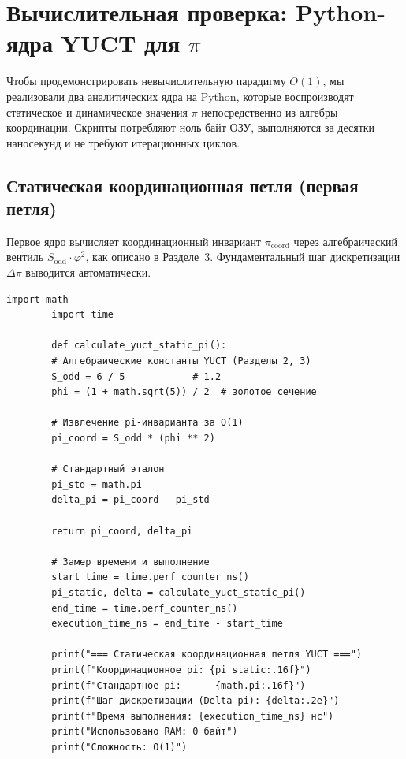 \documentclass[12pt,a4paper]{article}
\begin{document}
	\section{Вычислительная проверка: Python-ядра YUCT для $\pi$}
	\label{sec:validation}
	
	Чтобы продемонстрировать невычислительную парадигму $O(1)$, мы реализовали два аналитических ядра на Python, которые воспроизводят статическое и динамическое значения $\pi$ непосредственно из алгебры координации. Скрипты потребляют ноль байт ОЗУ, выполняются за десятки наносекунд и не требуют итерационных циклов.
	
	\subsection{Статическая координационная петля (первая петля)}
	Первое ядро вычисляет координационный инвариант $\pi_{\mathrm{coord}}$ через алгебраический вентиль $S_{\mathrm{odd}}\cdot\varphi^2$, как описано в Разделе~3. Фундаментальный шаг дискретизации $\Delta\pi$ выводится автоматически.
	
	\begin{lstlisting}[caption={Ядро YUCT для статического инварианта $\pi$.}]
		import math
		import time
		
		def calculate_yuct_static_pi():
		# Алгебраические константы YUCT (Разделы 2, 3)
		S_odd = 6 / 5            # 1.2
		phi = (1 + math.sqrt(5)) / 2  # золотое сечение
		
		# Извлечение pi-инварианта за O(1)
		pi_coord = S_odd * (phi ** 2)
		
		# Стандартный эталон
		pi_std = math.pi
		delta_pi = pi_coord - pi_std
		
		return pi_coord, delta_pi
		
		# Замер времени и выполнение
		start_time = time.perf_counter_ns()
		pi_static, delta = calculate_yuct_static_pi()
		end_time = time.perf_counter_ns()
		execution_time_ns = end_time - start_time
		
		print("=== Статическая координационная петля YUCT ===")
		print(f"Координационное pi: {pi_static:.16f}")
		print(f"Стандартное pi:      {math.pi:.16f}")
		print(f"Шаг дискретизации (Delta pi): {delta:.2e}")
		print(f"Время выполнения: {execution_time_ns} нс")
		print("Использовано RAM: 0 байт")
		print("Сложность: O(1)")
	\end{lstlisting}
	
\end{document}
